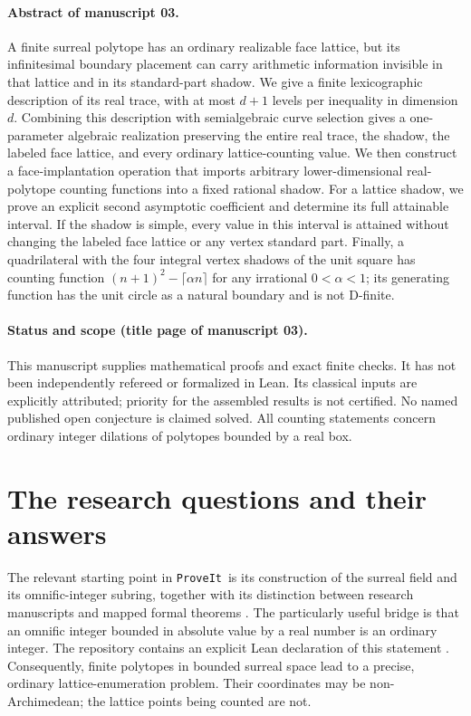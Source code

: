 \documentclass[11pt,a4paper]{article}
\numberwithin{equation}{section}
\theoremstyle{plain}
\newcommand{\repo}{\texttt{ProveIt}}
\begin{document}
\paragraph{Abstract of manuscript 03.}
A finite surreal polytope has an ordinary realizable face lattice, but its
infinitesimal boundary placement can carry arithmetic information invisible
in that lattice and in its standard-part shadow. We give a finite
lexicographic description of its real trace, with at most $d+1$ levels per
inequality in dimension $d$. Combining this description with semialgebraic
curve selection gives a one-parameter algebraic realization preserving the
entire real trace, the shadow, the labeled face lattice, and every ordinary
lattice-counting value. We then construct a face-implantation operation that
imports arbitrary lower-dimensional real-polytope counting functions into a
fixed rational shadow. For a lattice shadow, we prove an explicit second
asymptotic coefficient and determine its full attainable interval. If the
shadow is simple, every value in this interval is attained without changing
the labeled face lattice or any vertex standard part. Finally, a quadrilateral
with the four integral vertex shadows of the unit square has counting function
$(n+1)^2-\lceil\alpha n\rceil$ for any irrational $0<\alpha<1$; its generating
function has the unit circle as a natural boundary and is not D-finite.

\paragraph{Status and scope (title page of manuscript 03).} This manuscript supplies mathematical
proofs and exact finite checks. It has not been independently refereed or
formalized in Lean. Its classical inputs are explicitly attributed; priority
for the assembled results is not certified. No named published open conjecture
is claimed solved. All counting statements concern ordinary integer dilations
of polytopes bounded by a real box.


\section{The research questions and their answers}\label{poly:ehr:sec:introduction}

The relevant starting point in \repo\ is its construction of the surreal
field and its omnific-integer subring, together with its distinction between
research manuscripts and mapped formal theorems \cite{ehr:repo-readme,ehr:repo-guide}.
The particularly useful bridge is that an omnific integer bounded in absolute
value by a real number is an ordinary integer. The repository contains an
explicit Lean declaration of this statement \cite{ehr:repo-units}. Consequently,
finite polytopes in bounded surreal space lead to a precise, ordinary
lattice-enumeration problem. Their coordinates may be non-Archimedean; the
lattice points being counted are not.
\end{document}
